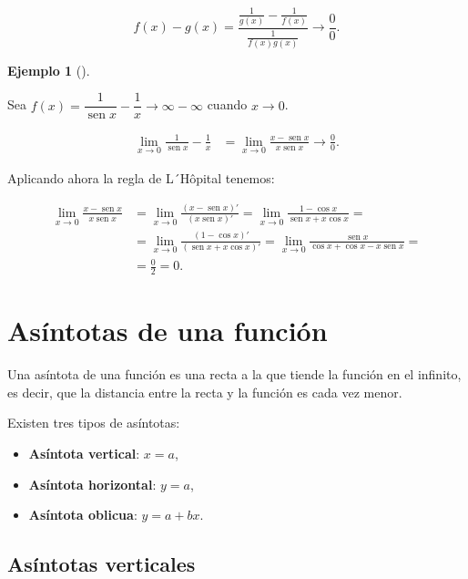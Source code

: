 \documentclass[
  a4paper,
]{scrreport}
\providecommand{\tightlist}{%
  \setlength{\itemsep}{0pt}\setlength{\parskip}{0pt}}\usepackage{longtable,booktabs,array}
\theoremstyle{definition}
\newtheorem{example}{Ejemplo}[chapter]
\theoremstyle{plain}
\theoremstyle{definition}
\theoremstyle{definition}
\theoremstyle{plain}
\theoremstyle{plain}
\theoremstyle{remark}
\begin{document}
\[f(x)-g(x)=\frac{\frac{1}{g(x)}-\frac{1}{f(x)}}{\frac{1}{f(x)g(x)}}\to \frac{0}{0}.\]

\begin{example}[]\protect\hypertarget{exm-solucion-indeterminacion-diferencia}{}\label{exm-solucion-indeterminacion-diferencia}

Sea
\(f(x)=\dfrac{1}{\operatorname{sen} x}-\dfrac{1}{x} \to \infty-\infty\)
cuando \(x\to 0\).

\begin{align*}
\lim_{x\to 0} \frac{1}{\operatorname{sen} x}-\frac{1}{x} &=
\lim_{x\to 0} \frac{x-\operatorname{sen} x}{x\operatorname{sen} x} \to \frac{0}{0}.
\end{align*}

Aplicando ahora la regla de L´Hôpital tenemos:

\begin{align*}
\lim_{x\to 0} \frac{x-\operatorname{sen} x}{x\operatorname{sen} x} & =
\lim_{x\to 0} \frac{\left(x-\operatorname{sen} x\right)'}{\left(x\operatorname{sen} x\right)'}=
\lim_{x\to 0} \frac{1-\cos x}{\operatorname{sen} x +x\cos x} = \\
&= \lim_{x\to 0} \frac{\left(1-\cos x\right)'}{\left(\operatorname{sen} x +x\cos x\right)'} =
\lim_{x\to 0} \frac{\operatorname{sen} x}{\cos x +\cos x-x\operatorname{sen} x}=\\
&= \frac{0}{2}=0.
\end{align*}

\end{example}

\section{Asíntotas de una función}\label{asuxedntotas-de-una-funciuxf3n}

Una asíntota de una función es una recta a la que tiende la función en
el infinito, es decir, que la distancia entre la recta y la función es
cada vez menor.

Existen tres tipos de asíntotas:

\begin{itemize}
\tightlist
\item
  \textbf{Asíntota vertical}: \(x=a\),
\item
  \textbf{Asíntota horizontal}: \(y=a\),
\item
  \textbf{Asíntota oblicua}: \(y=a+bx\).
\end{itemize}

\subsection{Asíntotas verticales}\label{asuxedntotas-verticales}
\end{document}
